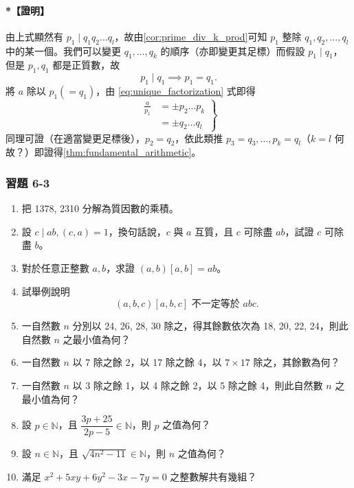 \paragraph{*【證明】}
由上式顯然有 $p_1 \mid q_1 q_2 \dots q_l$，故由\cref{cor:prime_div_k_prod}可知 $p_1$ 整除 $q_1, q_2, \dots, q_l$ 中的某一個。我們可以變更 $q_1, \dots, q_k$ 的順序（亦即變更其足標）而假設 $p_1 \mid q_1$，但是 $p_1, q_1$ 都是正質數，故
\begin{equation*}
  p_1 \mid q_1 \implies p_1 = q_1.
\end{equation*}
將 $a$ 除以 $p_1 (=q_1)$，由 \eqref{eq:unique_factorization} 式即得
\begin{equation}
  \left. \begin{aligned}
    \frac{a}{p_1} &= \pm p_2 \dots p_k \\
    &= \pm q_2 \dots q_l
  \end{aligned} \right\} \label{eq:unique_factorization_quot}
\end{equation}
同理可證（在適當變更足標後），$p_2 = q_2$，依此類推 $p_3 = q_3, \dots, p_k = q_l$（$k=l$ 何故？）即證得\cref{thm:fundamental_arithmetic}。

\subsubsection*{習題 6-3}\label{sec:ex6-3}

\begin{enumerate}[1.]
  \item 把 1378, 2310 分解為質因數的乘積。

  \item 設 $c \mid ab, (c, a) = 1$，換句話說，$c$ 與 $a$ 互質，且 $c$ 可除盡 $ab$，試證 $c$ 可除盡 $b$。

  \item 對於任意正整數 $a, b$，求證 $(a, b)[a, b] = ab$。

  \item 試舉例說明
  \begin{equation*}
    (a, b, c)[a, b, c] \text{ 不一定等於 } abc.
  \end{equation*}

  \item 一自然數 $n$ 分別以 24, 26, 28, 30 除之，得其餘數依次為 18, 20, 22, 24，則此自然數 $n$ 之最小值為何？

  \item 一自然數 $n$ 以 7 除之餘 2，以 17 除之餘 4，以 $7 \times 17$ 除之，其餘數為何？

  \item 一自然數 $n$ 以 3 除之餘 1，以 4 除之餘 2，以 5 除之餘 4，則此自然數 $n$ 之最小值為何？

  \item 設 $p \in \mathbb{N}$，且 $\dfrac{3p+25}{2p-5} \in \mathbb{N}$，則 $p$ 之值為何？

  \item 設 $n \in \mathbb{N}$，且 $\sqrt{4n^2-11} \in \mathbb{N}$，則 $n$ 之值為何？

  \item 滿足 $x^2 + 5xy + 6y^2 - 3x - 7y = 0$ 之整數解共有幾組？
\end{enumerate}

